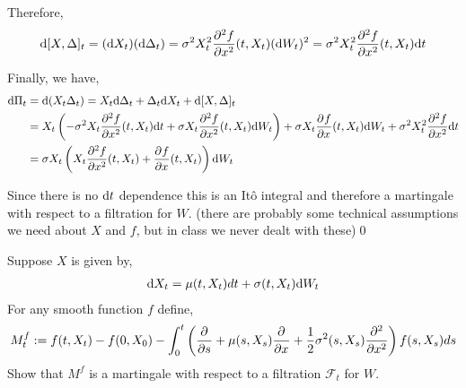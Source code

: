 \begin{solution}[Solution]
Therefore,
\begin{align*}
    \d[X,\Delta]_t = (\d X_t)(\d \Delta_t) 
    = \sigma^2 X_t^2 \dfrac{\partial^2f}{\partial x^2}(t,X_t) (\d W_t)^2 
    = \sigma^2 X_t^2 \dfrac{\partial^2f}{\partial x^2}(t,X_t) \d t
\end{align*}


Finally, we have,
\begin{align*}
    \d \Pi_t &= \d(X_t \Delta _t) = X_t \d\Delta _t + \Delta_t \d X_t + \d[X,\Delta]_t \\
    &= X_t \left( -\sigma^2 X_t \pp[2]{f}{x}(t,X_t) \d t + \sigma X_t \pp[2]{f}{x}(t,X_t)\d W_t \right) 
    + \sigma X_t \pp{f}{x}(t,X_t) \d W_t 
    + \sigma^2 X_t^2 \pp[2]{f}{x} \d t 
    \\&= \sigma X_t \left( X_t \pp[2]{f}{x}(t,X_t) + \pp{f}{x}(t,X_t)\right) \d W_t
\end{align*}

Since there is no \( \d t \) dependence this is an It\^o integral and therefore a martingale with respect to a filtration for \( W \). (there are probably some technical assumptions we need about \( X \) and \( f \), but in class we never dealt with these)\qed

\end{solution}

\pagebreak
\begin{problem}[Exercise 8.4]
Suppose \( X \) is given by,
\begin{align*}
    \d X_t = \mu(t,X_t)dt + \sigma(t,X_t) \d W_t
\end{align*}
For any smooth function \( f \) define,
\begin{align*}
    M_t^f:= f(t,X_t) - f(0,X_0) - \int_{0}^{t} \left( \pp{}{s} + \mu(s,X_s)\pp{}{x} + \dfrac{1}{2}\sigma^2(s,X_s) \pp[2]{}{x} \right) f(s,X_s)ds
\end{align*}
    Show that \( M^f \) is a martingale with respect to a filtration \( \mathcal{F}_t \) for \( W \).
\end{problem}


